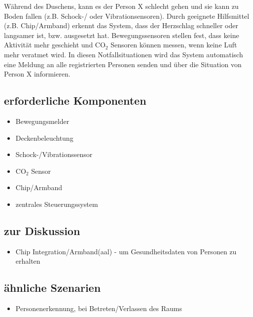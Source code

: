 Während des Duschens, kann es der Person X schlecht gehen und sie kann zu Boden fallen (z.B. Schock-/ oder Vibrationsensoren). Durch geeignete Hilfsmittel (z.B. Chip/Armband) erkennt das System, dass der Herzschlag schneller oder langsamer ist, bzw. ausgesetzt hat. Bewegungssensoren stellen fest, dass keine Aktivität mehr geschieht und CO$_2$ Sensoren können messen, wenn keine Luft mehr veratmet wird. In diesen Notfallsituationen wird das System automatisch eine Meldung an alle registrierten Personen senden und über die Situation von Person X informieren.

\subsection{erforderliche Komponenten}
\begin{itemize}
	\item Bewegungsmelder
	\item Deckenbeleuchtung
	\item Schock-/Vibrationssensor
	\item CO$_2$ Sensor
	\item Chip/Armband
	\item zentrales Steuerungssystem
\end{itemize}

\subsection{zur Diskussion}
\begin{itemize}
	\item Chip Integration/Armband(\gls{aal}) - um Gesundheitsdaten von Personen zu erhalten
\end{itemize}

\subsection{ähnliche Szenarien}
\begin{itemize}
	\item Personenerkennung, bei Betreten/Verlassen des Raums
\end{itemize}
